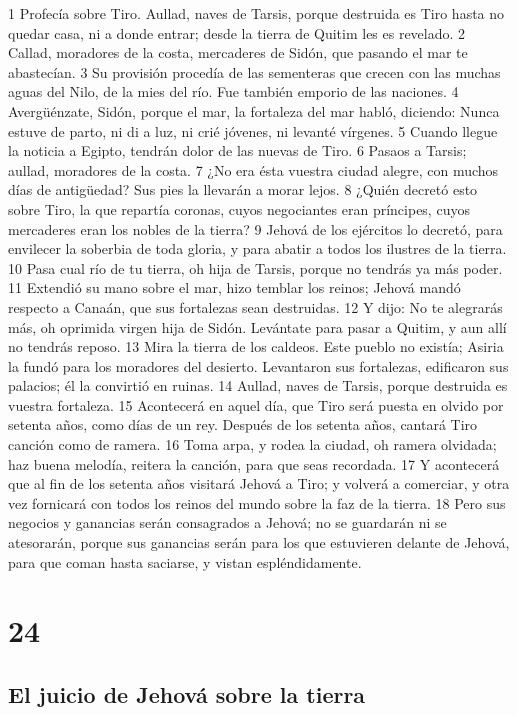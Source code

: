 1 Profecía sobre Tiro. Aullad, naves de Tarsis, porque destruida es Tiro hasta no quedar casa, ni a donde entrar; desde la tierra de Quitim les es revelado.
2 Callad, moradores de la costa, mercaderes de Sidón, que pasando el mar te abastecían.
3 Su provisión procedía de las sementeras que crecen con las muchas aguas del Nilo, de la mies del río. Fue también emporio de las naciones.
4 Avergüénzate, Sidón, porque el mar, la fortaleza del mar habló, diciendo: Nunca estuve de parto, ni di a luz, ni crié jóvenes, ni levanté vírgenes.
5 Cuando llegue la noticia a Egipto, tendrán dolor de las nuevas de Tiro.
6 Pasaos a Tarsis; aullad, moradores de la costa.
7 ¿No era ésta vuestra ciudad alegre, con muchos días de antigüedad? Sus pies la llevarán a morar lejos.
8 ¿Quién decretó esto sobre Tiro, la que repartía coronas, cuyos negociantes eran príncipes, cuyos mercaderes eran los nobles de la tierra?
9 Jehová de los ejércitos lo decretó, para envilecer la soberbia de toda gloria, y para abatir a todos los ilustres de la tierra.
10 Pasa cual río de tu tierra, oh hija de Tarsis, porque no tendrás ya más poder.
11 Extendió su mano sobre el mar, hizo temblar los reinos; Jehová mandó respecto a Canaán, que sus fortalezas sean destruidas.
12 Y dijo: No te alegrarás más, oh oprimida virgen hija de Sidón. Levántate para pasar a Quitim, y aun allí no tendrás reposo.
13 Mira la tierra de los caldeos. Este pueblo no existía; Asiria la fundó para los moradores del desierto. Levantaron sus fortalezas, edificaron sus palacios; él la convirtió en ruinas.
14 Aullad, naves de Tarsis, porque destruida es vuestra fortaleza.
15 Acontecerá en aquel día, que Tiro será puesta en olvido por setenta años, como días de un rey. Después de los setenta años, cantará Tiro canción como de ramera.
16 Toma arpa, y rodea la ciudad, oh ramera olvidada; haz buena melodía, reitera la canción, para que seas recordada.
17 Y acontecerá que al fin de los setenta años visitará Jehová a Tiro; y volverá a comerciar, y otra vez fornicará con todos los reinos del mundo sobre la faz de la tierra.
18 Pero sus negocios y ganancias serán consagrados a Jehová; no se guardarán ni se atesorarán, porque sus ganancias serán para los que estuvieren delante de Jehová, para que coman hasta saciarse, y vistan espléndidamente. 

\chapter{24}

\section*{El juicio de Jehová sobre la tierra}

